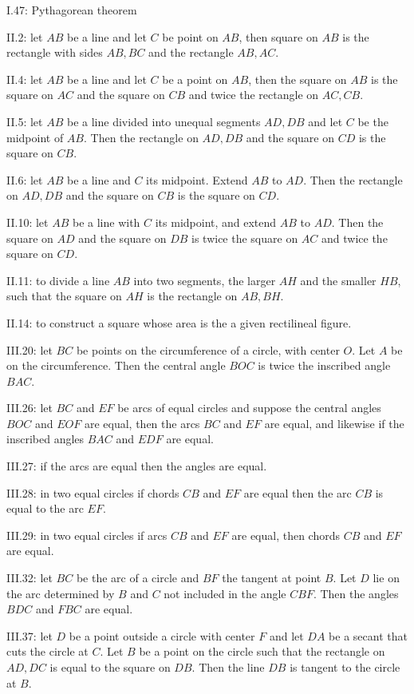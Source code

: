 \documentclass{amsart}
\theoremstyle{definition}
\begin{document}
I.47: Pythagorean theorem

II.2: let $AB$ be a line and let $C$ be point on $AB$, then square on $AB$ is the rectangle with sides $AB,BC$ and the rectangle
$AB,AC$.

II.4: let $AB$ be a line and let $C$ be a point on $AB$, then the square on $AB$ is the square on $AC$ and the square on $CB$
and twice the rectangle on $AC,CB$. 

II.5: let $AB$ be a line divided into unequal segments $AD,DB$ and let $C$ be the midpoint of $AB$. Then the rectangle on $AD,DB$ and the square on $CD$
is the square on $CB$.

II.6: let $AB$ be a line and $C$ its midpoint. Extend $AB$ to $AD$. Then the rectangle on $AD,DB$ and the square on $CB$ is the square on $CD$.

II.10: let $AB$ be a line with $C$ its midpoint, and extend $AB$ to $AD$. Then the square on $AD$ and the square on $DB$ is twice the square on $AC$ and twice the square
on $CD$. 

II.11: to divide a line $AB$ into two segments, the larger $AH$ and the smaller $HB$, such that the square on $AH$ is the rectangle
on $AB,BH$. 

II.14: to construct a square whose area is the a given rectilineal figure.

III.20: let $BC$ be points on the circumference of a circle, with center $O$. Let $A$ be on the circumference. Then
the central angle $BOC$ is twice the inscribed angle $BAC$. 

III.26: let $BC$ and $EF$ be arcs of equal circles and suppose the central angles $BOC$ and $EOF$ are equal, then
the arcs $BC$ and $EF$ are equal, and likewise if the inscribed angles $BAC$ and $EDF$ are equal.

III.27: if the arcs are equal then the angles are equal.

III.28: in two equal circles if chords $CB$ and $EF$ are equal then the arc $CB$ is equal to the arc $EF$.

III.29: in two equal circles if arcs $CB$ and $EF$ are equal, then chords $CB$  and $EF$ are equal.

III.32: let $BC$ be the arc of a circle and $BF$ the tangent at point $B$. Let $D$ lie on the arc determined by $B$ and $C$  not included
in the angle $CBF$. Then the angles $BDC$ and $FBC$ are equal.

III.37: let $D$ be a point outside a circle with center $F$ and let $DA$ be a secant that cuts the circle at $C$. Let $B$ be a point on the circle
such that the rectangle on $AD,DC$ is equal to the square on $DB$.
Then the line $DB$ is tangent to the circle at $B$.
\end{document}
